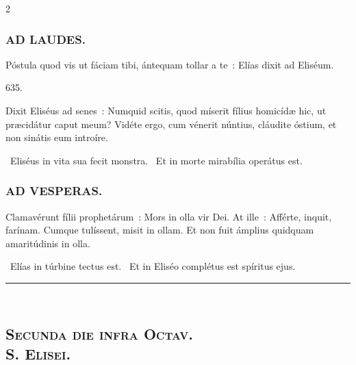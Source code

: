 \documentclass[9pt,twoside]{extarticle}
\begin{document}
\begin{multicols}{2}
{\subsubsection*{\center \textsc{AD LAUDES.}}
\begin{tightlist}{}
\item {} Póstula quod vis ut fáciam tibi, ántequam tollar a te~: Elías dixit ad Eliséum.
\item {} 635.
\item {} Dixit Eliséus ad senes~: Numquid scitis, quod míserit fílius homicídæ hic, ut præcidátur caput meum? Vidéte ergo, cum vénerit núntius, cláudite óstium, et non sinátis eum introíre.
\item {}
\item {}~Eliséus in vita sua fecit monstra. ~Et in morte mirabília operátus est.
\item {}
\end{tightlist}

\subsubsection*{\center \textsc{AD VESPERAS.}}
\begin{tightlist}{}
\item {}
\item {} Clamavérunt fílii prophetárum~: Mors in olla vir Dei. At ille~: Afférte, inquit, farínam. Cumque tulíssent, misit in ollam. Et non fuit ámplius quidquam amaritúdinis in olla.
\item {}
\item {}~Elías in túrbine tectus est. ~Et in Eliséo complétus est spíritus ejus.
\end{tightlist}

\begin{center}\textcolor{red}{\rule{\linewidth}{0.5pt}} \end{center}

\subsection*{\center \textsc{\\ Secunda die infra Octav.\\
S. Elisei.}}
}
\end{multicols}
\end{document}
